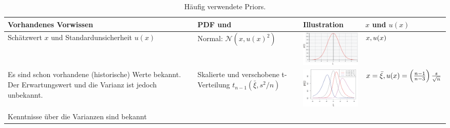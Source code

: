 \begin{table}[!htbp]
	\caption{Häufig verwendete Priors.}
	\centering
	\begin{tabular}{m{3cm} |m{3cm} m{4.5cm}| m{3cm}}  \hline 
		Vorhandenes Vorwissen & PDF \hspace{1em} und & Illustration & $x$ und $u(x)$\\ 
		\hline \vspace*{2ex}
		Schätzwert $x$ und Standardunsicherheit $u(x)$ \vspace*{4ex} &
		Normal: $\mathcal{N} (x, u(x)^2)$ & 
				\includegraphics[width=40mm]{08_vorlesung/media/Prior_Normalverteilung.png}
	 & $x,\newline u(x)$ \\
	 \hline \vspace*{2ex}
	 Es sind schon vorhandene (historische) Werte bekannt. Der Erwartungswert und die Varianz ist jedoch unbekannt. \vspace*{4ex} &
	 Skalierte und \newline verschobene t-Verteilung $t_{n-1}(\bar \xi, s^2/n)$ & 
	 \includegraphics[width=40mm]{08_vorlesung/media/Prior_Studentverteilung.png}
	 & $x = \bar \xi, \newline u(x) = \left(\frac{n-1}{n-3}\right) \frac{s}{\sqrt{n}}$ \\
	 \hline \vspace*{6ex}
	 Kenntnisse über die Varianzen sind bekannt \vspace*{4ex} &
	

\end{tabular}
\end{table}
